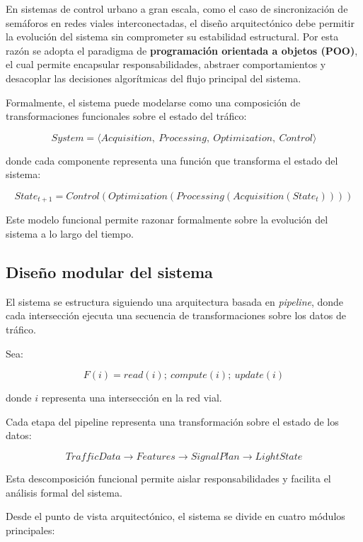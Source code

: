 \documentclass[12pt]{article}
\begin{document}
En sistemas de control urbano a gran escala, como el caso de sincronización de semáforos en redes viales interconectadas, el diseño arquitectónico debe permitir la evolución del sistema sin comprometer su estabilidad estructural. Por esta razón se adopta el paradigma de \textbf{programación orientada a objetos (POO)}, el cual permite encapsular responsabilidades, abstraer comportamientos y desacoplar las decisiones algorítmicas del flujo principal del sistema.

Formalmente, el sistema puede modelarse como una composición de transformaciones funcionales sobre el estado del tráfico:

\[
System = \langle Acquisition,\ Processing,\ Optimization,\ Control \rangle
\]

donde cada componente representa una función que transforma el estado del sistema:

\[
State_{t+1} = Control(Optimization(Processing(Acquisition(State_t))))
\]

Este modelo funcional permite razonar formalmente sobre la evolución del sistema a lo largo del tiempo.

\subsection{Diseño modular del sistema}

El sistema se estructura siguiendo una arquitectura basada en \textit{pipeline}, donde cada intersección ejecuta una secuencia de transformaciones sobre los datos de tráfico.

Sea:

\[
F(i) = read(i); \ compute(i); \ update(i)
\]

donde \(i\) representa una intersección en la red vial.

Cada etapa del pipeline representa una transformación sobre el estado de los datos:

\[
TrafficData \rightarrow Features \rightarrow SignalPlan \rightarrow LightState
\]

Esta descomposición funcional permite aislar responsabilidades y facilita el análisis formal del sistema.

Desde el punto de vista arquitectónico, el sistema se divide en cuatro módulos principales:
\end{document}

